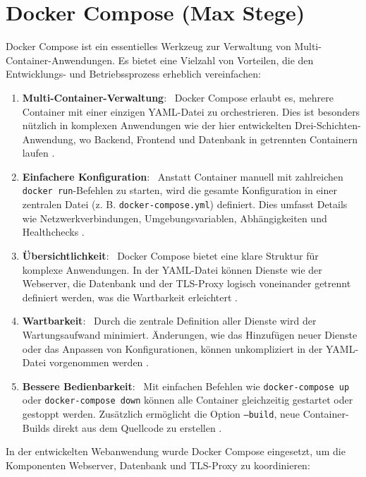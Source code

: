 \chapter{Docker Compose (Max Stege)}

Docker Compose ist ein essentielles Werkzeug zur Verwaltung von Multi-Container-Anwendungen. Es bietet eine Vielzahl von Vorteilen, die den Entwicklungs- und Betriebssprozess erheblich vereinfachen:

\begin{enumerate}
\item \textbf{Multi-Container-Verwaltung}: \
Docker Compose erlaubt es, mehrere Container mit einer einzigen YAML-Datei zu orchestrieren. Dies ist besonders nützlich in komplexen Anwendungen wie der hier entwickelten Drei-Schichten-Anwendung, wo Backend, Frontend und Datenbank in getrennten Containern laufen \cite{docker_compose_docs}.

\item \textbf{Einfachere Konfiguration}: \
Anstatt Container manuell mit zahlreichen \texttt{docker run}-Befehlen zu starten, wird die gesamte Konfiguration in einer zentralen Datei (z. B. \texttt{docker-compose.yml}) definiert. Dies umfasst Details wie Netzwerkverbindungen, Umgebungsvariablen, Abhängigkeiten und Healthchecks \cite{fava2024}.

\item \textbf{Übersichtlichkeit}: \
Docker Compose bietet eine klare Struktur für komplexe Anwendungen. In der YAML-Datei können Dienste wie der Webserver, die Datenbank und der TLS-Proxy logisch voneinander getrennt definiert werden, was die Wartbarkeit erleichtert \cite{watada2019}.

\item \textbf{Wartbarkeit}: \
Durch die zentrale Definition aller Dienste wird der Wartungsaufwand minimiert. Änderungen, wie das Hinzufügen neuer Dienste oder das Anpassen von Konfigurationen, können unkompliziert in der YAML-Datei vorgenommen werden \cite{fava2024}.

\item \textbf{Bessere Bedienbarkeit}: \
Mit einfachen Befehlen wie \texttt{docker-compose up} oder \texttt{docker-compose down} können alle Container gleichzeitig gestartet oder gestoppt werden. Zusätzlich ermöglicht die Option \texttt{--build}, neue Container-Builds direkt aus dem Quellcode zu erstellen \cite{docker_compose_docs}.
\end{enumerate}

In der entwickelten Webanwendung wurde Docker Compose eingesetzt, um die Komponenten Webserver, Datenbank und TLS-Proxy zu koordinieren:

